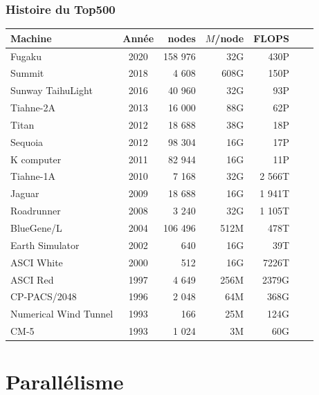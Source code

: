 \documentclass[xcolor={x11names,svgnames}]{beamer}
\begin{document}
\begin{frame}
  \frametitle{Histoire du Top500}

  \small
  \begin{tabular}{|l||c|r|r|r|r|r|}
  \hline
  Machine             & Année & nodes   & $M$/node & FLOPS \\
  \hline\hline
Fugaku                & 2020 & 158 976	& 32G	   &   430P  \\
Summit                & 2018 &   4 608	& 608G	   &   150P  \\
Sunway TaihuLight     & 2016 &  40 960	& 32G	   &    93P  \\
Tiahne-2A             & 2013 &  16 000	& 88G	   &    62P  \\
Titan                 & 2012 &  18 688	& 38G	   &    18P  \\
Sequoia	              & 2012 &  98 304	& 16G	   &    17P  \\
K computer            & 2011 &  82 944	& 16G	   &    11P  \\
Tiahne-1A             & 2010 &   7 168	& 32G	   & 2 566T  \\
Jaguar                & 2009 &  18 688	& 16G	   & 1 941T  \\
Roadrunner            & 2008 &   3 240	& 32G	   & 1 105T  \\
BlueGene/L            & 2004 & 106 496	& 512M	   &   478T  \\
Earth Simulator       &	2002 &     640	& 16G	   &    39T  \\
ASCI White            &	2000 &     512	& 16G	   &  7226T  \\
ASCI Red              &	1997 &   4 649	& 256M	   &  2379G  \\
CP-PACS/2048          &	1996 &   2 048	& 64M	   &   368G  \\
Numerical Wind Tunnel &	1993 &     166	& 25M	   &   124G  \\
CM-5                  &	1993 &   1 024	& 3M	   &    60G  \\
\hline
\end{tabular}

\end{frame}



\section{Parallélisme}
\end{document}
